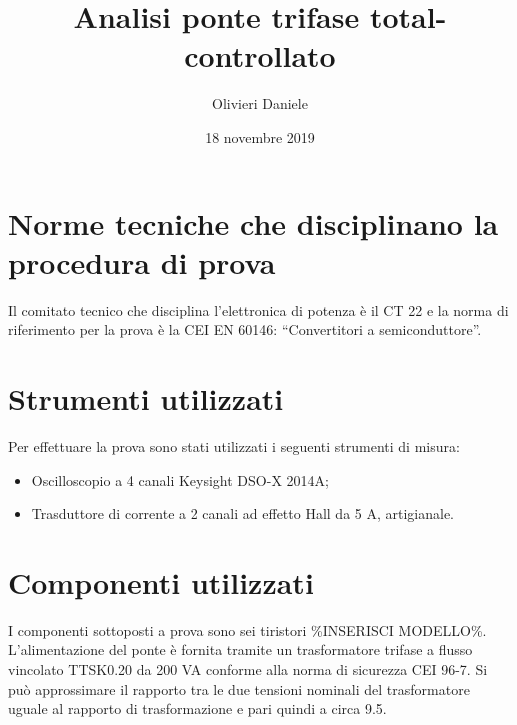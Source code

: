 \documentclass[a4paper,11pt]{article}
\title{Analisi ponte trifase total-controllato}
\author{Olivieri Daniele}
\date{18 novembre 2019}
\begin{document}
\maketitle

\begin{abstract}

\end{abstract}

\section{Norme tecniche che disciplinano la procedura di prova}
Il comitato tecnico che disciplina l'elettronica di potenza è il CT 22 e la norma
di riferimento per la prova è la CEI EN 60146: ``Convertitori a semiconduttore''.

\section{Strumenti utilizzati}
Per effettuare la prova sono stati utilizzati i seguenti strumenti di misura:
\begin{itemize}
 \item Oscilloscopio a 4 canali Keysight DSO-X 2014A;
 \item Trasduttore di corrente a 2 canali ad effetto Hall da 5 A, artigianale.
\end{itemize}

\section{Componenti utilizzati}
I componenti sottoposti a prova sono sei tiristori \%INSERISCI MODELLO\%.
L'alimentazione del ponte è fornita tramite un trasformatore trifase a flusso vincolato 
TTSK0.20 da 200 VA conforme alla norma di sicurezza CEI 96-7.
Si può approssimare il rapporto tra le due tensioni nominali del trasformatore uguale al 
rapporto di trasformazione e pari quindi a circa 9.5.
\end{document}
